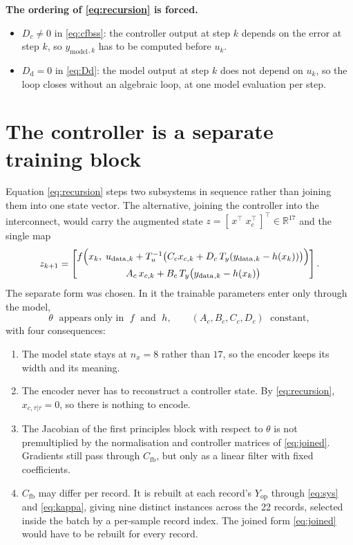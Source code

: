 \documentclass[11pt]{article}
\newcommand{\R}{\mathbb{R}}
\newcommand{\Cfb}{C_{\mathrm{fb}}}
\newcommand{\udata}{u_{\mathrm{data}}}
\newcommand{\ydata}{y_{\mathrm{data}}}
\newcommand{\ymodel}{y_{\mathrm{model}}}
\newcommand{\Yop}{Y_{\mathrm{op}}}
\newcommand{\Tu}{T_{u}}
\newcommand{\Ty}{T_{y}}
\begin{document}
\medskip\noindent\textbf{The ordering of \eqref{eq:recursion} is forced.}
\begin{itemize}
  \item $D_c \neq 0$ in \eqref{eq:cfbss}: the controller output at step $k$ depends on the error
        at step $k$, so $\ymodel{}_{,k}$ has to be computed before $u_k$.
  \item $D_{\mathrm{d}} = 0$ in \eqref{eq:Dd}: the model output at step $k$ does not depend on
        $u_k$, so the loop closes without an algebraic loop, at one model evaluation per step.
\end{itemize}

\section{The controller is a separate training block}
\label{sec:block}

Equation \eqref{eq:recursion} steps two subsystems in sequence rather than joining them into one
state vector. The alternative, joining the controller into the interconnect, would carry the
augmented state $z = [\,x^{\top}\; x_c^{\top}\,]^{\top} \in \R^{17}$ and the single map
\begin{equation}
  z_{k+1} =
  \begin{bmatrix}
    f\Bigl(x_k,\;\udata{}_{,k}
      + \Tu^{-1}\bigl(C_c x_{c,k} + D_c\,\Ty(\ydata{}_{,k} - h(x_k))\bigr)\Bigr) \\[2mm]
    A_c\,x_{c,k} + B_c\,\Ty\bigl(\ydata{}_{,k} - h(x_k)\bigr)
  \end{bmatrix} .
  \label{eq:joined}
\end{equation}
The separate form was chosen. In it the trainable parameters enter only through the model,
\begin{equation}
  \theta \;\text{ appears only in }\; f \;\text{ and }\; h ,
  \qquad
  (A_c, B_c, C_c, D_c) \;\text{ constant} ,
  \label{eq:theta}
\end{equation}
with four consequences:
\begin{enumerate}
  \item The model state stays at $n_x = 8$ rather than $17$, so the encoder keeps its width and
        its meaning.
  \item The encoder never has to reconstruct a controller state. By \eqref{eq:recursion},
        $x_{c,\tau|\tau} = 0$, so there is nothing to encode.
  \item The Jacobian of the first principles block with respect to $\theta$ is not premultiplied
        by the normalisation and controller matrices of \eqref{eq:joined}. Gradients still pass
        through $\Cfb$, but only as a linear filter with fixed coefficients.
  \item $\Cfb$ may differ per record. It is rebuilt at each record's $\Yop$ through
        \eqref{eq:sys} and \eqref{eq:kappa}, giving nine distinct instances across the
        22 records, selected inside the batch by a per-sample record index. The joined form
        \eqref{eq:joined} would have to be rebuilt for every record.
\end{enumerate}
\end{document}
